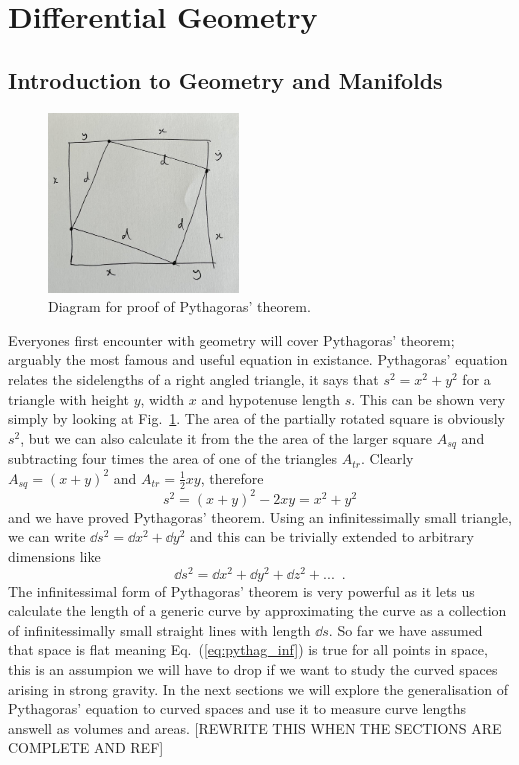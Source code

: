 \section{Differential Geometry}
\subsection{Introduction to Geometry and Manifolds}
\begin{figure}
\centering
    \includegraphics[width=0.45\textwidth]{pics/pythag_proof.png}
    \caption{Diagram for proof of Pythagoras' theorem.}
    \label{fig:pythag_proof}
\end{figure}




Everyones first encounter with geometry will cover Pythagoras' theorem; arguably the most famous and useful equation in existance. Pythagoras' equation relates the sidelengths of a right angled triangle, it says that $s^2 = x^2 + y^2$ for a triangle with height $y$, width $x$ and hypotenuse length $s$. This can be shown very simply by looking at Fig.~\ref{fig:pythag_proof}. The area of the partially rotated square is obviously $s^2$, but we can also calculate it from the the area of the larger square $A_{sq}$ and subtracting four times the area of one of the triangles $A_{tr}$. Clearly $A_{sq} = (x+y)^2$ and $A_{tr} = \frac{1}{2}xy$, therefore 
\begin{equation}
s^2 = (x+y)^2-2xy = x^2 + y^2
\end{equation}
and we have proved Pythagoras' theorem. Using an infinitessimally small triangle, we can write $\dd s^2 = \dd x^2 + \dd y^2$ and this can be trivially extended to arbitrary dimensions like
\begin{equation}\label{eq:pythag_inf}
\dd s^2 = \dd x^2 + \dd y^2 + \dd z^2 + ...\,\,\,.
\end{equation}
The infinitessimal form of Pythagoras' theorem is very powerful as it lets us calculate the length of a generic curve by approximating the curve as a collection of infinitessimally small straight lines with length $\dd s$. So far we have assumed that space is flat meaning Eq.~(\ref{eq:pythag_inf}) is true for all points in space, this is an assumpion we will have to drop if we want to study the curved spaces arising in strong gravity. In the next sections we will explore the generalisation of Pythagoras' equation to curved spaces and use it to measure curve lengths answell as volumes and areas. [REWRITE THIS WHEN THE SECTIONS ARE COMPLETE AND REF]

